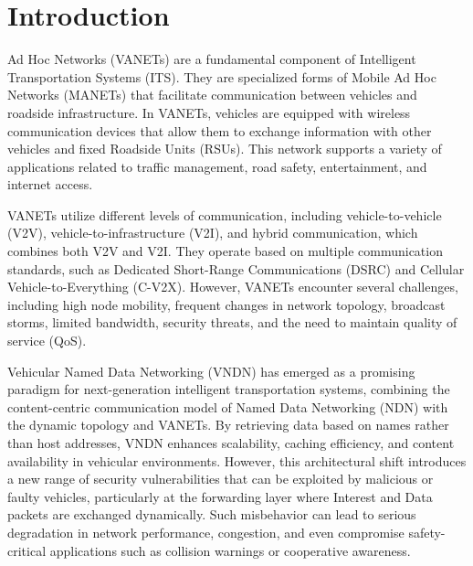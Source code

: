 \documentclass[journal,comsoc]{IEEEtran}
\begin{document}
%
\IEEEpeerreviewmaketitle



\section{Introduction}
% 
% 
% 
% 
  Ad Hoc Networks (VANETs) are a fundamental component of Intelligent Transportation Systems (ITS). They are specialized forms of Mobile Ad Hoc Networks (MANETs) that facilitate communication between vehicles and roadside infrastructure. In VANETs, vehicles are equipped with wireless communication devices that allow them to exchange information with other vehicles and fixed Roadside Units (RSUs). This network supports a variety of applications related to traffic management, road safety, entertainment, and internet access.

VANETs utilize different levels of communication, including vehicle-to-vehicle (V2V), vehicle-to-infrastructure (V2I), and hybrid communication, which combines both V2V and V2I. They operate based on multiple communication standards, such as Dedicated Short-Range Communications (DSRC) and Cellular Vehicle-to-Everything (C-V2X). However, VANETs encounter several challenges, including high node mobility, frequent changes in network topology, broadcast storms, limited bandwidth, security threats, and the need to maintain quality of service (QoS).


Vehicular Named Data Networking (VNDN) has emerged as a promising paradigm for next-generation intelligent transportation systems, combining the content-centric communication model of Named Data Networking (NDN) with the dynamic topology and VANETs. By retrieving data based on names rather than host addresses, VNDN enhances scalability, caching efficiency, and content availability in vehicular environments. However, this architectural shift introduces a new range of security vulnerabilities that can be exploited by malicious or faulty vehicles, particularly at the forwarding layer where Interest and Data packets are exchanged dynamically. Such misbehavior can lead to serious degradation in network performance, congestion, and even compromise safety-critical applications such as collision warnings or cooperative awareness.
\end{document}
